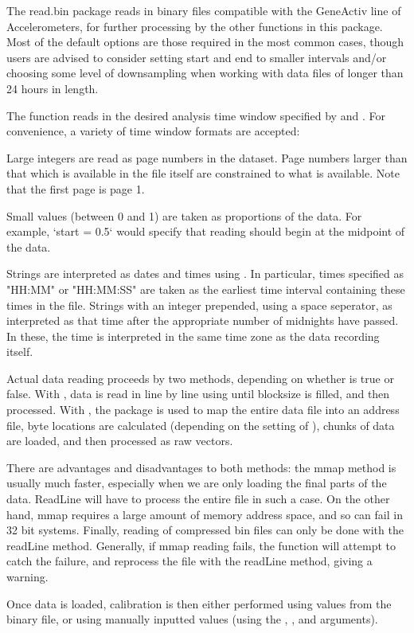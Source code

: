 \documentclass[a4paper]{book}
\begin{document}
\begin{Details}\relax
The read.bin package reads in binary files compatible with the GeneActiv line of Accelerometers, for further processing by the other functions in this package. Most of the default options are those required in the most common cases, though users are advised to consider setting start and end to smaller intervals and/or choosing some level of downsampling when working with data files of longer than 24 hours in length.

The function reads in the desired analysis time window specified by  and . For convenience, a variety of time window formats are accepted:

Large integers are read as page numbers in the dataset. Page numbers larger than that which is available in the file itself are constrained to what is available. Note that the first page is page 1.

Small values (between 0 and 1) are taken as proportions of the data. For example, `start = 0.5` would specify that reading should begin at the midpoint of the data.

Strings are interpreted as dates and times using . In particular, times specified as "HH:MM" or "HH:MM:SS" are taken as the earliest time interval containing these times in the file. Strings with an integer prepended, using a space seperator, as interpreted as that time after the appropriate number of midnights have passed. In these, the time is interpreted in the same time zone as the data recording itself.

Actual data reading proceeds by two methods, depending on whether  is true or false. With , data is read in line by line using  until blocksize is filled, and then processed. With , the  package is used to map the entire data file into an address file, byte locations are calculated (depending on the setting of ),  chunks of data are loaded, and then processed as raw vectors. 

There are advantages and disadvantages to both methods: the mmap method is usually much faster, especially when we are only loading the final parts of the data. ReadLine will have to process the entire file in such a case. On the other hand, mmap requires a large amount of memory address space, and so can fail in 32 bit systems. Finally, reading of compressed bin files can only be done with the readLine method. Generally, if mmap reading fails, the function will attempt to catch the failure, and reprocess the file with the readLine method, giving a warning.

Once data is loaded, calibration is then either performed using values from the binary file, or using manually inputted values (using the , , and  arguments).

\end{Details}
\end{document}
